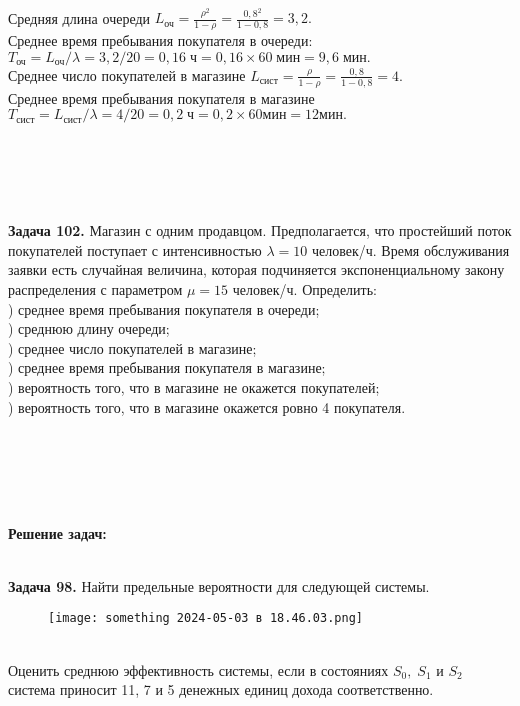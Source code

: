 \documentclass{article}
\begin{document}
 \\ \noindent Средняя длина очереди $L_{\text{оч}} = \frac{\rho^2}{1 - \rho} = \frac{0,8^2}{1 - 0,8} = 3,2.$ 
 \\ \noindent Среднее  время  пребывания  покупателя  в очереди: \\
 $T_{\text{оч}} = L_{\text{оч}} / \lambda =3,2/20=0,16 \; \text{ч} = 0,16\times60 \; \text{мин} = 9,6 \;  \text{мин.}$ \\ \noindent
 Среднее число покупателей в магазине $L_{\text{сист}} = \frac{\rho}{1-\rho} = \frac{0,8}{1 - 0,8} = 4.$ \\ \noindent
Среднее   время   пребывания   покупателя   в   магазине $T_{\text{сист}} = L_{\text{сист}}/\lambda = 4/20 = 0,2 \; \text{ч} = 0,2 \times 60 \text{мин} = 12 \text{мин.}$
\\ \\  \\ \\  \\ \\  
\indent \textbf{Задача  102.}  Магазин с одним продавцом.  Предполагается, что простейший поток покупателей поступает с интенсивностью $\lambda = 10$ человек/ч. Время обслуживания заявки есть случайная величина, которая  подчиняется экспоненциальному закону распределения с параметром $\mu = 15$ человек/ч. Определить: \\ ) среднее время пребывания покупателя в очереди; \\ ) среднюю длину очереди; \\ ) среднее число покупателей в магазине; \\ ) среднее время пребывания покупателя в магазине;\\ ) вероятность того, что в магазине не окажется покупателей; \\ ) вероятность того, что в магазине окажется ровно 4 покупателя.


\\ \\ \\ \\

\begin{center}
    \textbf{Решение задач:}
\end{center} \\  
\indent \; \; \; \textbf{Задача 98.} Найти предельные вероятности для следующей системы.
\begin{figure}[h] 
\centering
\texttt{[image: something 2024-05-03 в 18.46.03.png]}
\label{fig:my_label}
\end{figure} \\ 
\indent Оценить среднюю эффективность системы, если в состояниях $S_0,  \; S_1$ и $S_2$ система приносит 11, 7 и 5 денежных единиц дохода соответственно. \\ 
\end{document}
